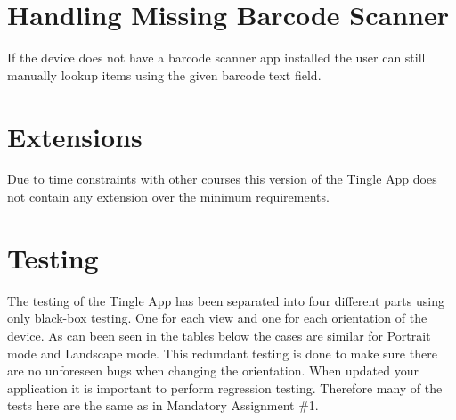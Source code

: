 \section{Handling Missing Barcode Scanner}
If the device does not have a barcode scanner app installed the user can still manually lookup items using the given
barcode text field.

\section{Extensions }
Due to time constraints with other courses this version of the Tingle
App does not contain any extension over the minimum requirements.

\section{Testing}
The testing of the Tingle App has been separated into four different parts using only black-box testing. One for each view and one for each orientation of the device. As can been seen in the tables below the cases are similar for Portrait mode and Landscape mode. This redundant testing is done to make sure there are no unforeseen bugs when changing the orientation. When updated your application it is important to perform regression testing. Therefore many of the tests here are the same as in Mandatory Assignment \#1.

